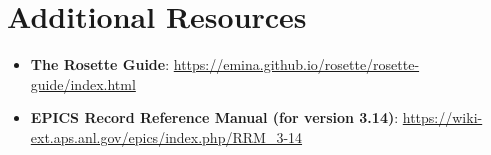 \documentclass[10pt]{article}
\begin{document}
\section{Additional Resources}

\begin{itemize}
\item \textbf{The Rosette Guide}: \url{https://emina.github.io/rosette/rosette-guide/index.html}
\item \textbf{EPICS Record Reference Manual (for version 3.14)}: \url{https://wiki-ext.aps.anl.gov/epics/index.php/RRM_3-14}
\end{itemize}
\end{document}

